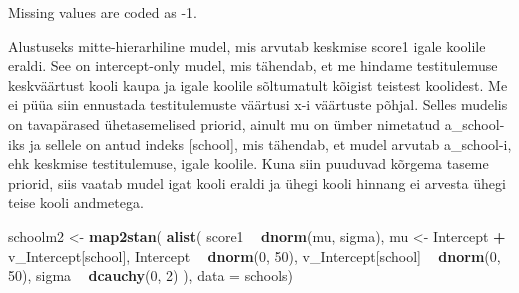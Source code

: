 \documentclass[]{book}
\newenvironment{Shaded}{\begin{snugshade}}{\end{snugshade}}
\newcommand{\KeywordTok}[1]{\textcolor[rgb]{0.13,0.29,0.53}{\textbf{#1}}}
\newcommand{\DataTypeTok}[1]{\textcolor[rgb]{0.13,0.29,0.53}{#1}}
\newcommand{\DecValTok}[1]{\textcolor[rgb]{0.00,0.00,0.81}{#1}}
\newcommand{\StringTok}[1]{\textcolor[rgb]{0.31,0.60,0.02}{#1}}
\newcommand{\OperatorTok}[1]{\textcolor[rgb]{0.81,0.36,0.00}{\textbf{#1}}}
\newcommand{\NormalTok}[1]{#1}
\begin{document}
Missing values are coded as -1.

\begin{Shaded}
\end{Shaded}

Alustuseks mitte-hierarhiline mudel, mis arvutab keskmise score1 igale
koolile eraldi. See on intercept-only mudel, mis tähendab, et me hindame
testitulemuse keskväärtust kooli kaupa ja igale koolile sõltumatult
kõigist teistest koolidest. Me ei püüa siin ennustada testitulemuste
väärtusi x-i väärtuste põhjal. Selles mudelis on tavapärased
ühetasemelised priorid, ainult mu on ümber nimetatud a\_school-iks ja
sellele on antud indeks {[}school{]}, mis tähendab, et mudel arvutab
a\_school-i, ehk keskmise testitulemuse, igale koolile. Kuna siin
puuduvad kõrgema taseme priorid, siis vaatab mudel igat kooli eraldi ja
ühegi kooli hinnang ei arvesta ühegi teise kooli andmetega.

\begin{Shaded}
\begin{Highlighting}[]
\NormalTok{schoolm2 <-}\StringTok{ }\KeywordTok{map2stan}\NormalTok{(}
  \KeywordTok{alist}\NormalTok{(}
\NormalTok{    score1 }\OperatorTok{~}\StringTok{ }\KeywordTok{dnorm}\NormalTok{(mu, sigma),}
\NormalTok{    mu <-}\StringTok{ }\NormalTok{Intercept }\OperatorTok{+}\StringTok{ }\NormalTok{v_Intercept[school],}
\NormalTok{    Intercept }\OperatorTok{~}\StringTok{ }\KeywordTok{dnorm}\NormalTok{(}\DecValTok{0}\NormalTok{, }\DecValTok{50}\NormalTok{),}
\NormalTok{    v_Intercept[school] }\OperatorTok{~}\StringTok{ }\KeywordTok{dnorm}\NormalTok{(}\DecValTok{0}\NormalTok{, }\DecValTok{50}\NormalTok{),}
\NormalTok{    sigma }\OperatorTok{~}\StringTok{ }\KeywordTok{dcauchy}\NormalTok{(}\DecValTok{0}\NormalTok{, }\DecValTok{2}\NormalTok{)}
\NormalTok{  ), }\DataTypeTok{data =}\NormalTok{ schools)}
\end{Highlighting}
\end{Shaded}
\end{document}
